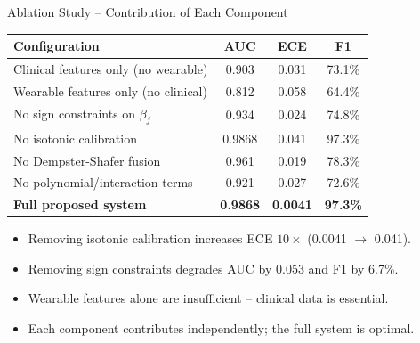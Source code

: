 \documentclass[aspectratio=169]{beamer}
\begin{document}
\begin{frame}{Ablation Study -- Contribution of Each Component}
  \begin{center}\small
  \begin{tabular}{@{}p{5.2cm}ccc@{}}
    \toprule
    \textbf{Configuration} & \textbf{AUC} & \textbf{ECE} & \textbf{F1} \\
    \midrule
    Clinical features only (no wearable) & 0.903 & 0.031 & 73.1\% \\
    Wearable features only (no clinical) & 0.812 & 0.058 & 64.4\% \\
    No sign constraints on $\beta_j$     & 0.934 & 0.024 & 74.8\% \\
    No isotonic calibration              & 0.9868 & 0.041 & 97.3\% \\
    No Dempster-Shafer fusion            & 0.961 & 0.019 & 78.3\% \\
    No polynomial/interaction terms      & 0.921 & 0.027 & 72.6\% \\
    \textbf{Full proposed system}        & \textbf{0.9868} & \textbf{0.0041} & \textbf{97.3\%} \\
    \bottomrule
  \end{tabular}
  \end{center}
  \begin{itemize}\small
    \item Removing isotonic calibration increases ECE $10\times$ (0.0041 $\to$ 0.041).
    \item Removing sign constraints degrades AUC by 0.053 and F1 by 6.7\%.
    \item Wearable features alone are insufficient -- clinical data is essential.
    \item Each component contributes independently; the full system is optimal.
  \end{itemize}
\end{frame}
\end{document}
